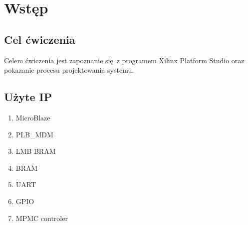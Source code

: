 \section{Wstęp}
\subsection{Cel ćwiczenia}
Celem ćwiczenia jest zapoznanie się z programem Xilinx Platform Studio oraz pokazanie procesu
projektowania systemu.

\subsection{Użyte IP}

\begin{enumerate}
	\item MicroBlaze
	\item PLB\_MDM
	\item LMB BRAM
	\item BRAM
	\item UART
	\item GPIO
	\item MPMC controler
\end{enumerate}

